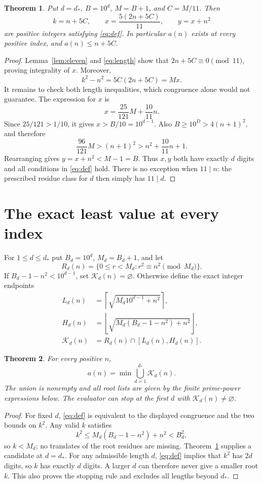 \documentclass[10pt]{article}
\newtheorem{theorem}{Theorem}
\begin{document}
\begin{theorem}\label{thm:witness}
Put $d=d_*$, $B=10^d$, $M=B+1$, and $C=M/11$. Then
\begin{equation}\label{eq:construction}
 k=n+5C,\qquad x=\frac{5(2n+5C)}{11},\qquad y=x+n^2
\end{equation}
are positive integers satisfying \eqref{eq:def}. In particular
$a(n)$ exists at every positive index, and $a(n)\le n+5C$.
\end{theorem}
\begin{proof}
Lemma~\ref{lem:eleven} and \eqref{eq:length} show that
$2n+5C\equiv0\pmod{11}$, proving integrality of $x$.
Moreover,
\[
 k^2-n^2=5C(2n+5C)=Mx.
\]
It remains to check both length inequalities, which congruence
alone would not guarantee. The expression for $x$ is
\[
 x=\frac{25}{121}M+\frac{10}{11}n.
\]
Since $25/121>1/10$, it gives $x>B/10=10^{d-1}$.
Also $B\ge10^D>4(n+1)^2$, and therefore
\[
 \frac{96}{121}M>(n+1)^2>
 n^2+\frac{10}{11}n+1.
\]
Rearranging gives $y=x+n^2<M-1=B$. Thus $x,y$ both have
exactly $d$ digits and all conditions in \eqref{eq:def} hold.
There is no exception when $11\mid n$: the prescribed residue
class for $d$ then simply has $11\mid d$.
\end{proof}

\section{The exact least value at every index}
For $1\le d\le d_*$ put $B_d=10^d$, $M_d=B_d+1$, and let
\[
 R_d(n)=\{0\le r<M_d:r^2\equiv n^2\pmod{M_d}\}.
\]
If $B_d-1-n^2<10^{d-1}$, set $\mathcal K_d(n)=\varnothing$.
Otherwise define the exact integer endpoints
\begin{align*}
 L_d(n)&=\left\lceil\sqrt{M_d10^{d-1}+n^2}\right\rceil,\\
 H_d(n)&=\left\lfloor\sqrt{M_d(B_d-1-n^2)+n^2}\right\rfloor,\\
 \mathcal K_d(n)&=R_d(n)\cap[L_d(n),H_d(n)].
\end{align*}
\begin{theorem}\label{thm:min}
For every positive $n$,
\[
 \boxed{a(n)=\min\bigcup_{d=1}^{d_*}\mathcal K_d(n).}
\]
The union is nonempty and all root lists are given by the finite
prime-power expressions below. The evaluator can stop at the first
$d$ with $\mathcal K_d(n)\ne\varnothing$.
\end{theorem}
\begin{proof}
For fixed $d$, \eqref{eq:def} is equivalent to the displayed
congruence and the two bounds on $k^2$. Any valid $k$ satisfies
\[
 k^2\le M_d(B_d-1-n^2)+n^2<B_d^2,
\]
so $k<M_d$; no translates of the root residues are missing.
Theorem~\ref{thm:witness} supplies a candidate at $d=d_*$.
For any admissible length $d$, \eqref{eq:def} implies that $k^2$
has $2d$ digits, so $k$ has exactly $d$ digits. A larger $d$ can
therefore never give a smaller root $k$. This also proves the
stopping rule and excludes all lengths beyond $d_*$.
\end{proof}
\end{document}
